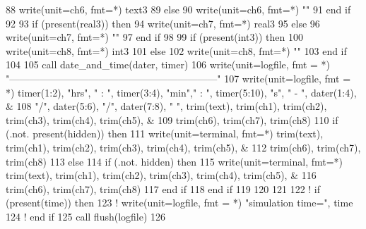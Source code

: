 \begin{DoxyCode}
88       \textcolor{keyword}{write}(unit=ch6, fmt=*) text3
89     \textcolor{keywordflow}{else}
90       \textcolor{keyword}{write}(unit=ch6, fmt=*) \textcolor{stringliteral}{""}
91 \textcolor{keywordflow}{    end if}
92 
93     \textcolor{keywordflow}{if} (\textcolor{keyword}{present}(real3)) \textcolor{keywordflow}{then}
94       \textcolor{keyword}{write}(unit=ch7, fmt=*) real3
95     \textcolor{keywordflow}{else}
96       \textcolor{keyword}{write}(unit=ch7, fmt=*) \textcolor{stringliteral}{""}
97 \textcolor{keywordflow}{    end if}
98 
99     \textcolor{keywordflow}{if} (\textcolor{keyword}{present}(int3)) \textcolor{keywordflow}{then}
100       \textcolor{keyword}{write}(unit=ch8, fmt=*) int3
101     \textcolor{keywordflow}{else}
102       \textcolor{keyword}{write}(unit=ch8, fmt=*) \textcolor{stringliteral}{""}
103 \textcolor{keywordflow}{    end if}
104 
105     \textcolor{keyword}{call }date\_and\_time(dater, timer)
106     \textcolor{keyword}{write}(unit=logfile, fmt = *) \textcolor{stringliteral}{"---------------------------------------------------------------"}
107     \textcolor{keyword}{write}(unit=logfile, fmt = *)  timer(1:2), \textcolor{stringliteral}{"hrs"}, \textcolor{stringliteral}{" : "}, timer(3:4), \textcolor{stringliteral}{"min"},\textcolor{stringliteral}{" : "}, timer(5:10), \textcolor{stringliteral}{"s"}, \textcolor{stringliteral}{"  -
        "}, dater(1:4), &
108        \textcolor{stringliteral}{"/"}, dater(5:6), \textcolor{stringliteral}{"/"}, dater(7:8), \textcolor{stringliteral}{"    "},  trim(text), trim(ch1), trim(ch2), trim(ch3), trim(ch4), 
      trim(ch5), &
109             trim(ch6), trim(ch7), trim(ch8)
110     \textcolor{keywordflow}{if} (.not. \textcolor{keyword}{present}(hidden)) \textcolor{keywordflow}{then}         
111       \textcolor{keyword}{write}(unit=terminal, fmt=*) trim(text), trim(ch1), trim(ch2), trim(ch3), trim(ch4), trim(ch5), &
112                       trim(ch6), trim(ch7), trim(ch8)
113     \textcolor{keywordflow}{else} 
114       \textcolor{keywordflow}{if} (.not. hidden) \textcolor{keywordflow}{then}
115         \textcolor{keyword}{write}(unit=terminal, fmt=*) trim(text), trim(ch1), trim(ch2), trim(ch3), trim(ch4), trim(ch5), &
116               trim(ch6), trim(ch7), trim(ch8)
117 \textcolor{keywordflow}{      end if}
118 \textcolor{keywordflow}{    end if}
119       
120 
121  
122 \textcolor{comment}{!     if (present(time)) then}
123 \textcolor{comment}{!       write(unit=logfile, fmt = *) "simulation time=", time}
124 \textcolor{comment}{!     end if}
125     \textcolor{keyword}{call }flush(logfile)
126 
\end{DoxyCode}


